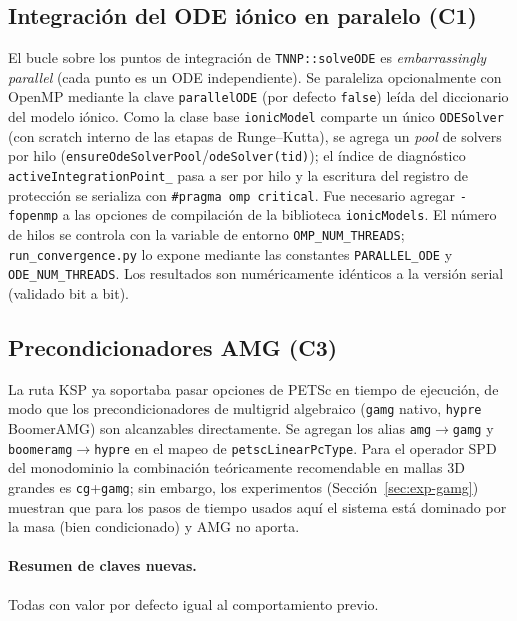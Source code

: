\documentclass[11pt,a4paper]{article}
\newcommand{\code}[1]{\texttt{\small #1}}
\newcommand{\pyconst}[1]{\textcolor{black!60!blue}{\texttt{\footnotesize #1}}}
\newcommand{\dictkey}[1]{\textcolor{black!60!green}{\texttt{\footnotesize #1}}}
\begin{document}
\subsection{Integración del ODE iónico en paralelo (C1)}
\label{sec:optim-C1}

El bucle sobre los puntos de integración de \code{TNNP::solveODE} es
\emph{embarrassingly parallel} (cada punto es un ODE independiente). Se paraleliza
opcionalmente con OpenMP mediante la clave \dictkey{parallelODE} (por defecto
\code{false}) leída del diccionario del modelo iónico. Como la clase base
\code{ionicModel} comparte un único \code{ODESolver} (con scratch interno de las
etapas de Runge--Kutta), se agrega un \emph{pool} de solvers por hilo
(\code{ensureOdeSolverPool}/\code{odeSolver(tid)}); el índice de diagnóstico
\code{activeIntegrationPoint\_} pasa a ser por hilo y la escritura del registro de
protección se serializa con \code{\#pragma omp critical}. Fue necesario agregar
\code{-fopenmp} a las opciones de compilación de la biblioteca \code{ionicModels}.
El número de hilos se controla con la variable de entorno \code{OMP\_NUM\_THREADS};
\code{run\_convergence.py} lo expone mediante las constantes \pyconst{PARALLEL\_ODE}
y \pyconst{ODE\_NUM\_THREADS}. Los resultados son numéricamente idénticos a la
versión serial (validado bit a bit).

\subsection{Precondicionadores AMG (C3)}
\label{sec:optim-C3}

La ruta KSP ya soportaba pasar opciones de PETSc en tiempo de ejecución, de modo
que los precondicionadores de multigrid algebraico (\code{gamg} nativo, \code{hypre}
BoomerAMG) son alcanzables directamente. Se agregan los alias
\code{amg}$\to$\code{gamg} y \code{boomeramg}$\to$\code{hypre} en el mapeo de
\dictkey{petscLinearPcType}. Para el operador SPD del monodominio la combinación
teóricamente recomendable en mallas 3D grandes es \code{cg}+\code{gamg}; sin
embargo, los experimentos (Sección~\ref{sec:exp-gamg}) muestran que para los pasos
de tiempo usados aquí el sistema está dominado por la masa (bien condicionado) y
AMG no aporta.

\paragraph{Resumen de claves nuevas.}
Todas con valor por defecto igual al comportamiento previo.
\end{document}
